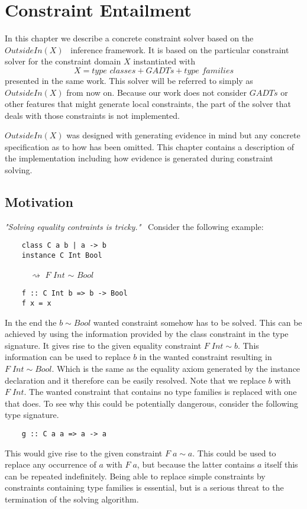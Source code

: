 \chapter{Constraint Entailment}
\label{cha:entailment}
In this chapter we describe a concrete constraint solver based on the
$OutsideIn(X)$~\cite{outsideinx-modular-type-inference-with-local-assumptions}
inference framework. It is based on the particular constraint solver for the
constraint domain $X$ instantiated with
\[
X = \textit{type classes} + \textit{GADTs} + \textit{type families}
\]
presented in the same work. This solver will be referred to simply as
$OutsideIn(X)$ from now on. Because our work does not consider $GADTs$ or other
features that might generate local constraints, the part of the solver that
deals with those constraints is not implemented.

$OutsideIn(X)$ was designed with generating evidence in mind but any concrete
specification as to how has been omitted. This chapter contains a description of
the implementation including how evidence is generated during constraint
solving.

\section{Motivation}
\textit{"Solving equality contraints is
tricky."}~\cite{outsideinx-modular-type-inference-with-local-assumptions}
Consider the following example:
\begin{verbatim}
    class C a b | a -> b
    instance C Int Bool
\end{verbatim}
$\quad\quad\quad\rightsquigarrow$ $F$ $Int$ $\sim$ $Bool$
\begin{verbatim}
    f :: C Int b => b -> Bool
    f x = x
\end{verbatim}

In the end the $b \sim Bool$ wanted constraint somehow has to be solved. This
can be achieved by using the information provided by the class constraint in the
type signature. It gives rise to the given equality constraint $F \; Int \sim
b$. This information can be used to replace $b$ in the wanted constraint
resulting in $F \; Int \sim Bool$. Which is the same as the equality axiom
generated by the instance declaration and it therefore can be easily resolved.
Note that we replace $b$ with $F \; Int$. The wanted constraint that contains no
type families is replaced with one that does. To see why this
could be potentially dangerous, consider the following type signature.
\begin{verbatim}
    g :: C a a => a -> a
\end{verbatim}
This would give rise to the given constraint $F \; a \sim a$. This could be used
to replace any occurrence of $a$ with $F \; a$, but because the latter contains
$a$ itself this can be repeated indefinitely. Being able to replace simple
constraints by constraints containing type families is essential, but is a serious threat to the
termination of the solving algorithm.

